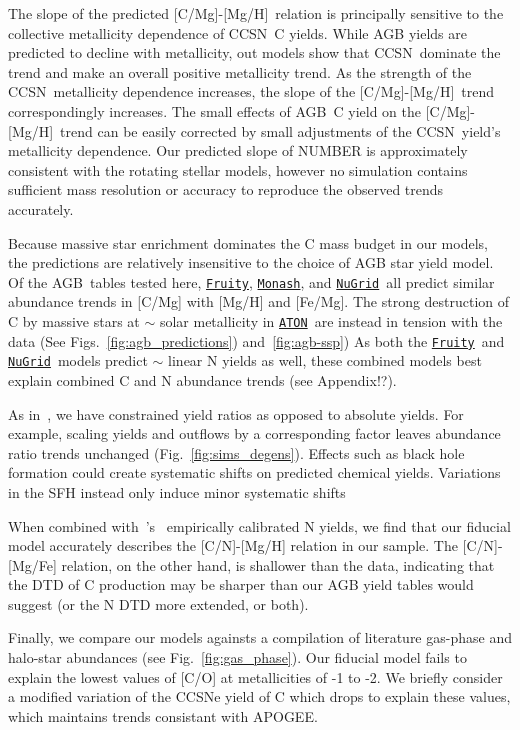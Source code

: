 \documentclass[fleqn,
usenatbib]{mnras}
\newcommand{\fruity}{\texttt{\hyperlink{fruity}{Fruity}}}
\newcommand{\nugrid}{\texttt{\hyperlink{nugrid}{NuGrid}}}
\newcommand{\monash}{\texttt{\hyperlink{monash}{Monash}}}
\newcommand{\aton}{\texttt{\hyperlink{aton}{ATON}}}
\newcommand{\agb}{AGB}
\newcommand{\cc}{CCSN}
\newcommand{\caah}{[C/Mg]-[Mg/H]}
\newcommand{\about}[1]{${\sim} #1$}
\begin{document}
The slope of the predicted \caah\ relation is principally sensitive to the collective metallicity dependence of \cc\ C yields.
While AGB yields are predicted to decline with metallicity, out models show that \cc\ dominate the trend and make an overall positive metallicity trend. 
As the strength of the \cc\ metallicity dependence increases, the slope of the \caah\ trend correspondingly increases. The small effects of \agb\ C yield on the \caah\ trend can be easily corrected by small adjustments of the \cc\ yield's metallicity dependence.
Our predicted slope of NUMBER is approximately consistent with the \citet{LC18} rotating stellar models, however no simulation contains sufficient mass resolution or accuracy to reproduce the observed trends accurately. 

Because massive star enrichment dominates the C mass budget in our models, the predictions are relatively insensitive to the choice of AGB star yield model.
Of the \agb\ tables tested here, \fruity, \monash, and \nugrid\ all predict similar abundance trends in [C/Mg] with [Mg/H] and [Fe/Mg]. The strong destruction of C by massive stars at \about{} solar metallicity   in \aton\ are instead in tension with the data (See Figs.~\ref{fig:agb_predictions})  and~\ref{fig:agb-ssp})
As both the \fruity\ and \nugrid\ models predict \about{} linear N yields as well, these combined models best explain combined C and N abundance trends (see Appendix!?).

As in~\citet{james+23}, we have constrained yield ratios as opposed to absolute yields. For example, scaling yields and outflows by a corresponding factor leaves abundance ratio trends unchanged (Fig.~\ref{fig:sims_degens}).  Effects such as black hole formation could create systematic shifts on predicted chemical yields.
Variations in the SFH instead only induce minor systematic shifts


When combined with~\citeauthor{james+23}'s~\citeyearpar{james+23} empirically calibrated N yields, we find that our fiducial model accurately describes the [C/N]-[Mg/H] relation in our sample. The [C/N]-[Mg/Fe] relation, on the other hand, is shallower than the data, indicating that the DTD of C production may be sharper than our AGB yield tables would suggest (or the N DTD more extended, or both).

Finally, we compare our models againsts a compilation of literature gas-phase and halo-star abundances (see Fig.~\ref{fig:gas_phase}). Our fiducial model fails to explain the lowest values of [C/O] at metallicities of -1 to -2. We briefly consider a modified variation of the CCSNe yield of C which drops to explain these values, which maintains trends consistant with APOGEE. 
\end{document}

